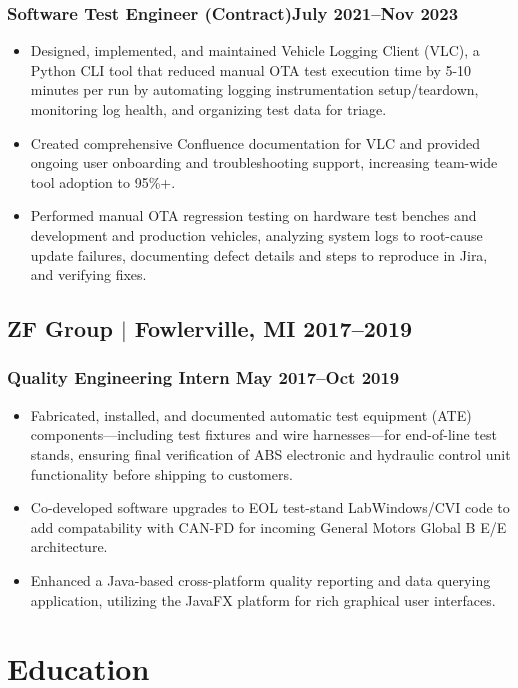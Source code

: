 \documentclass[11pt]{article} %
\begin{document}
\subsubsection{Software Test Engineer (Contract)\hfill July 2021--Nov 2023}
\begin{itemize}
	\item Designed, implemented, and maintained Vehicle Logging Client (VLC),
	a Python CLI tool that reduced manual OTA test execution time by 5-10 minutes per run
	by automating logging instrumentation setup/teardown, monitoring log health, and 
	organizing test data for triage. 
	\item Created comprehensive Confluence documentation for VLC and provided ongoing
	user onboarding and troubleshooting support, increasing team-wide tool adoption to 95\%+.
	\item Performed manual OTA regression testing on hardware test benches and development and 
	production vehicles, analyzing system logs to root-cause update failures, 
	documenting defect details and steps to reproduce in Jira, and verifying fixes.
\end{itemize}

\subsection{ZF Group $|$ {\normalfont Fowlerville, MI} \hfill 2017--2019}
\subsubsection{Quality Engineering Intern \hfill May 2017--Oct 2019}
\begin{itemize}
	\item Fabricated, installed, and documented automatic test equipment (ATE) components—including 
	test fixtures and wire harnesses—for end-of-line test stands, ensuring final verification of ABS 
	electronic and hydraulic control unit functionality before shipping to customers.
	\item Co-developed software upgrades to EOL test-stand LabWindows/CVI code to add compatability with CAN-FD for 
	incoming General Motors Global B E/E architecture.
	\item Enhanced a Java-based cross-platform quality reporting and data querying application, utilizing the JavaFX 
	platform for rich graphical user interfaces.
\end{itemize}

\section{Education}
\end{document}
